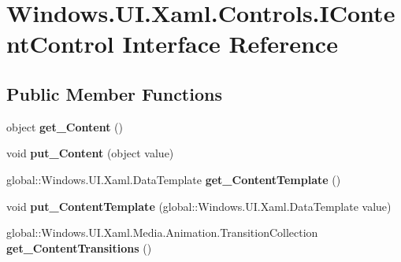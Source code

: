 \hypertarget{interface_windows_1_1_u_i_1_1_xaml_1_1_controls_1_1_i_content_control}{}\section{Windows.\+U\+I.\+Xaml.\+Controls.\+I\+Content\+Control Interface Reference}
\label{interface_windows_1_1_u_i_1_1_xaml_1_1_controls_1_1_i_content_control}
\subsection*{Public Member Functions}
\begin{DoxyCompactItemize}
\item 
\mbox{\label{interface_windows_1_1_u_i_1_1_xaml_1_1_controls_1_1_i_content_control_ab27572e586326eb57ff5e937f9ed7318}} 
object {\bfseries get\+\_\+\+Content} ()
\item 
\mbox{\label{interface_windows_1_1_u_i_1_1_xaml_1_1_controls_1_1_i_content_control_a5350840458a62ceb693e7746c04986f3}} 
void {\bfseries put\+\_\+\+Content} (object value)
\item 
\mbox{\label{interface_windows_1_1_u_i_1_1_xaml_1_1_controls_1_1_i_content_control_aa941dee35deb2872cc78a0e3bbfaa7f6}} 
global\+::\+Windows.\+U\+I.\+Xaml.\+Data\+Template {\bfseries get\+\_\+\+Content\+Template} ()
\item 
\mbox{\label{interface_windows_1_1_u_i_1_1_xaml_1_1_controls_1_1_i_content_control_ab8635fb05ae89dd2ff4d0697e5c78b84}} 
void {\bfseries put\+\_\+\+Content\+Template} (global\+::\+Windows.\+U\+I.\+Xaml.\+Data\+Template value)
\item 
\mbox{\label{interface_windows_1_1_u_i_1_1_xaml_1_1_controls_1_1_i_content_control_aa51222b3d15db7740854e4ddbad68fd3}} 
global\+::\+Windows.\+U\+I.\+Xaml.\+Media.\+Animation.\+Transition\+Collection {\bfseries get\+\_\+\+Content\+Transitions} ()

\end{DoxyCompactItemize}
